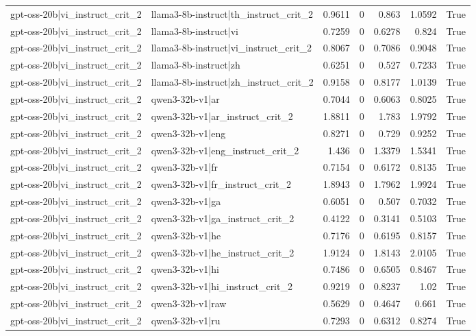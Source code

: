 \begin{table}
\begin{tabular}{l l r r r r l}
gpt-oss-20b|vi_instruct_crit_2 & llama3-8b-instruct|th_instruct_crit_2 & 0.9611 & 0 & 0.863 & 1.0592 & True \\
gpt-oss-20b|vi_instruct_crit_2 & llama3-8b-instruct|vi & 0.7259 & 0 & 0.6278 & 0.824 & True \\
gpt-oss-20b|vi_instruct_crit_2 & llama3-8b-instruct|vi_instruct_crit_2 & 0.8067 & 0 & 0.7086 & 0.9048 & True \\
gpt-oss-20b|vi_instruct_crit_2 & llama3-8b-instruct|zh & 0.6251 & 0 & 0.527 & 0.7233 & True \\
gpt-oss-20b|vi_instruct_crit_2 & llama3-8b-instruct|zh_instruct_crit_2 & 0.9158 & 0 & 0.8177 & 1.0139 & True \\
gpt-oss-20b|vi_instruct_crit_2 & qwen3-32b-v1|ar & 0.7044 & 0 & 0.6063 & 0.8025 & True \\
gpt-oss-20b|vi_instruct_crit_2 & qwen3-32b-v1|ar_instruct_crit_2 & 1.8811 & 0 & 1.783 & 1.9792 & True \\
gpt-oss-20b|vi_instruct_crit_2 & qwen3-32b-v1|eng & 0.8271 & 0 & 0.729 & 0.9252 & True \\
gpt-oss-20b|vi_instruct_crit_2 & qwen3-32b-v1|eng_instruct_crit_2 & 1.436 & 0 & 1.3379 & 1.5341 & True \\
gpt-oss-20b|vi_instruct_crit_2 & qwen3-32b-v1|fr & 0.7154 & 0 & 0.6172 & 0.8135 & True \\
gpt-oss-20b|vi_instruct_crit_2 & qwen3-32b-v1|fr_instruct_crit_2 & 1.8943 & 0 & 1.7962 & 1.9924 & True \\
gpt-oss-20b|vi_instruct_crit_2 & qwen3-32b-v1|ga & 0.6051 & 0 & 0.507 & 0.7032 & True \\
gpt-oss-20b|vi_instruct_crit_2 & qwen3-32b-v1|ga_instruct_crit_2 & 0.4122 & 0 & 0.3141 & 0.5103 & True \\
gpt-oss-20b|vi_instruct_crit_2 & qwen3-32b-v1|he & 0.7176 & 0 & 0.6195 & 0.8157 & True \\
gpt-oss-20b|vi_instruct_crit_2 & qwen3-32b-v1|he_instruct_crit_2 & 1.9124 & 0 & 1.8143 & 2.0105 & True \\
gpt-oss-20b|vi_instruct_crit_2 & qwen3-32b-v1|hi & 0.7486 & 0 & 0.6505 & 0.8467 & True \\
gpt-oss-20b|vi_instruct_crit_2 & qwen3-32b-v1|hi_instruct_crit_2 & 0.9219 & 0 & 0.8237 & 1.02 & True \\
gpt-oss-20b|vi_instruct_crit_2 & qwen3-32b-v1|raw & 0.5629 & 0 & 0.4647 & 0.661 & True \\
gpt-oss-20b|vi_instruct_crit_2 & qwen3-32b-v1|ru & 0.7293 & 0 & 0.6312 & 0.8274 & True \\

\end{tabular}
\end{table}
